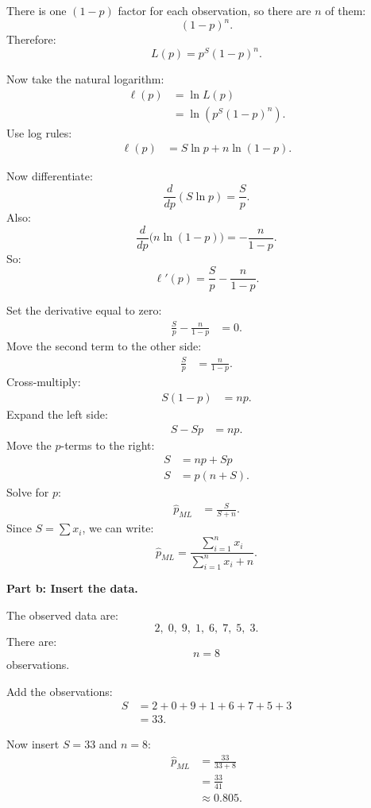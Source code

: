 \documentclass[11pt,a4paper]{article}
\begin{document}
There is one \((1-p)\) factor for each observation, so there are \(n\) of them:
\[
(1-p)^n.
\]
Therefore:
\[
L(p)=p^S(1-p)^n.
\]

Now take the natural logarithm:
\begin{align*}
\ell(p)
&=\ln L(p)\\
&=\ln\left(p^S(1-p)^n\right).
\end{align*}
Use log rules:
\begin{align*}
\ell(p)
&=S\ln p+n\ln(1-p).
\end{align*}

Now differentiate:
\[
\frac{d}{dp}(S\ln p)=\frac{S}{p}.
\]
Also:
\[
\frac{d}{dp}\bigl(n\ln(1-p)\bigr)=-\frac{n}{1-p}.
\]
So:
\[
\ell'(p)=\frac{S}{p}-\frac{n}{1-p}.
\]

Set the derivative equal to zero:
\begin{align*}
\frac{S}{p}-\frac{n}{1-p}&=0.
\end{align*}
Move the second term to the other side:
\begin{align*}
\frac{S}{p}&=\frac{n}{1-p}.
\end{align*}
Cross-multiply:
\begin{align*}
S(1-p)&=np.
\end{align*}
Expand the left side:
\begin{align*}
S-Sp&=np.
\end{align*}
Move the \(p\)-terms to the right:
\begin{align*}
S&=np+Sp\\
S&=p(n+S).
\end{align*}
Solve for \(p\):
\begin{align*}
\hat p_{ML}
&=\frac{S}{S+n}.
\end{align*}
Since \(S=\sum x_i\), we can write:
\[
\hat p_{ML}=\frac{\sum_{i=1}^n x_i}{\sum_{i=1}^n x_i+n}.
\]

\textbf{Part b: Insert the data.}

The observed data are:
\[
2,\;0,\;9,\;1,\;6,\;7,\;5,\;3.
\]
There are:
\[
n=8
\]
observations.

Add the observations:
\begin{align*}
S
&=2+0+9+1+6+7+5+3\\
&=33.
\end{align*}

Now insert \(S=33\) and \(n=8\):
\begin{align*}
\hat p_{ML}
&=\frac{33}{33+8}\\
&=\frac{33}{41}\\
&\approx 0.805.
\end{align*}
\end{document}
